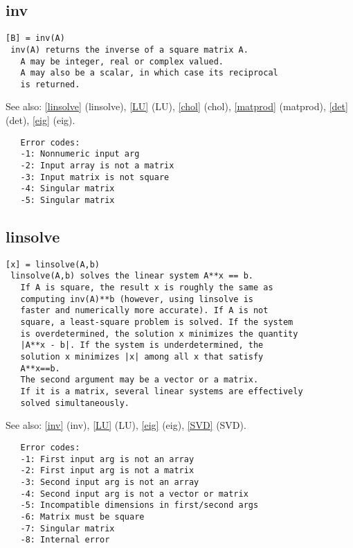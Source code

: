\documentclass[a4paper]{article}
\begin{document}
\subsection{inv\label{inv}}

\begin{tscreen}
\begin{verbatim}
[B] = inv(A)
 inv(A) returns the inverse of a square matrix A.
   A may be integer, real or complex valued.
   A may also be a scalar, in which case its reciprocal
   is returned.
\end{verbatim}

See also: \ref{linsolve} {(linsolve)}, \ref{LU} {(LU)}, \ref{chol} {(chol)}, \ref{matprod} {(matprod)}, \ref{det} {(det)}, \ref{eig} {(eig)}.
\begin{verbatim}
   Error codes:
   -1: Nonnumeric input arg
   -2: Input array is not a matrix
   -3: Input matrix is not square
   -4: Singular matrix
   -5: Singular matrix 
\end{verbatim}
\end{tscreen}



\subsection{linsolve\label{linsolve}}

\begin{tscreen}
\begin{verbatim}
[x] = linsolve(A,b)
 linsolve(A,b) solves the linear system A**x == b.
   If A is square, the result x is roughly the same as
   computing inv(A)**b (however, using linsolve is
   faster and numerically more accurate). If A is not
   square, a least-square problem is solved. If the system
   is overdetermined, the solution x minimizes the quantity
   |A**x - b|. If the system is underdetermined, the
   solution x minimizes |x| among all x that satisfy
   A**x==b.
   The second argument may be a vector or a matrix.
   If it is a matrix, several linear systems are effectively
   solved simultaneously.
\end{verbatim}

See also: \ref{inv} {(inv)}, \ref{LU} {(LU)}, \ref{eig} {(eig)}, \ref{SVD} {(SVD)}.
\begin{verbatim}
   Error codes:
   -1: First input arg is not an array
   -2: First input arg is not a matrix
   -3: Second input arg is not an array
   -4: Second input arg is not a vector or matrix
   -5: Incompatible dimensions in first/second args
   -6: Matrix must be square
   -7: Singular matrix
   -8: Internal error
   
\end{verbatim}
\end{tscreen}
\end{document}
